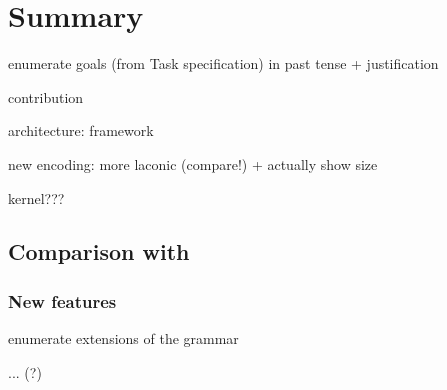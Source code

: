 \chapter{Summary}
\label{ch:summary}

enumerate goals (from Task specification) in past tense + justification

contribution

  architecture:  framework

  new encoding: more laconic (compare!) + actually show size

  kernel???





\section{Comparison with \porthos{}}


\subsection{New features}

enumerate extensions of the grammar

... (?)
